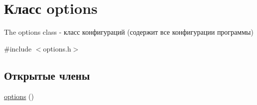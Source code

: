 \hypertarget{classoptions}{}\section{Класс options}
\label{classoptions}


The options class -\/ класс конфигураций (содержит все конфигурации программы)  




{\ttfamily \#include $<$options.\+h$>$}

\subsection*{Открытые члены}
\begin{DoxyCompactItemize}
\item 
\hypertarget{classoptions_a41a256b4ba3b2d68a2d72b9245aa0c4d}{}\hyperlink{classoptions_a41a256b4ba3b2d68a2d72b9245aa0c4d}{options} ()\label{classoptions_a41a256b4ba3b2d68a2d72b9245aa0c4d}


\end{DoxyCompactItemize}
